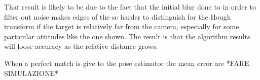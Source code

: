 That result is likely to be due to the fact that the initial blur done to in order to filter out noise makes edges of the \acrshort{sc} harder to distinguish for the Hough transform if the target is relatively far from the camera, especially for some particular attitudes like the one shown. The result is that the algorithm results will loose accuracy as the relative distance grows.

When a perfect match is give to the pose estimator the mean error are *FARE SIMULAZIONE*